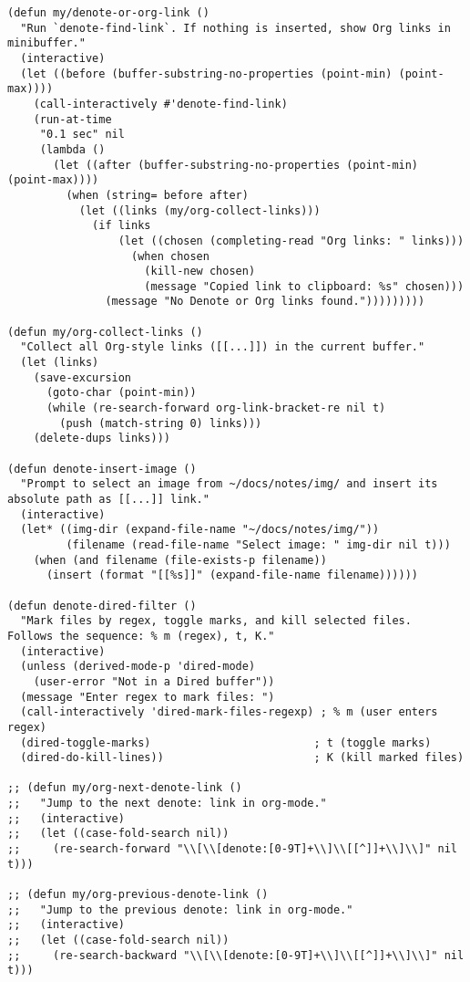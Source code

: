 \documentclass[11pt]{article}
\begin{document}
\begin{verbatim}
(defun my/denote-or-org-link ()
  "Run `denote-find-link`. If nothing is inserted, show Org links in minibuffer."
  (interactive)
  (let ((before (buffer-substring-no-properties (point-min) (point-max))))
    (call-interactively #'denote-find-link)
    (run-at-time
     "0.1 sec" nil
     (lambda ()
       (let ((after (buffer-substring-no-properties (point-min) (point-max))))
         (when (string= before after)
           (let ((links (my/org-collect-links)))
             (if links
                 (let ((chosen (completing-read "Org links: " links)))
                   (when chosen
                     (kill-new chosen)
                     (message "Copied link to clipboard: %s" chosen)))
               (message "No Denote or Org links found.")))))))))

(defun my/org-collect-links ()
  "Collect all Org-style links ([[...]]) in the current buffer."
  (let (links)
    (save-excursion
      (goto-char (point-min))
      (while (re-search-forward org-link-bracket-re nil t)
        (push (match-string 0) links)))
    (delete-dups links)))

(defun denote-insert-image ()
  "Prompt to select an image from ~/docs/notes/img/ and insert its absolute path as [[...]] link."
  (interactive)
  (let* ((img-dir (expand-file-name "~/docs/notes/img/"))
         (filename (read-file-name "Select image: " img-dir nil t)))
    (when (and filename (file-exists-p filename))
      (insert (format "[[%s]]" (expand-file-name filename))))))

(defun denote-dired-filter ()
  "Mark files by regex, toggle marks, and kill selected files.
Follows the sequence: % m (regex), t, K."
  (interactive)
  (unless (derived-mode-p 'dired-mode)
    (user-error "Not in a Dired buffer"))
  (message "Enter regex to mark files: ")
  (call-interactively 'dired-mark-files-regexp) ; % m (user enters regex)
  (dired-toggle-marks)                         ; t (toggle marks)
  (dired-do-kill-lines))                       ; K (kill marked files)

;; (defun my/org-next-denote-link ()
;;   "Jump to the next denote: link in org-mode."
;;   (interactive)
;;   (let ((case-fold-search nil))
;;     (re-search-forward "\\[\\[denote:[0-9T]+\\]\\[[^]]+\\]\\]" nil t)))

;; (defun my/org-previous-denote-link ()
;;   "Jump to the previous denote: link in org-mode."
;;   (interactive)
;;   (let ((case-fold-search nil))
;;     (re-search-backward "\\[\\[denote:[0-9T]+\\]\\[[^]]+\\]\\]" nil t)))


\end{verbatim}
\end{document}
